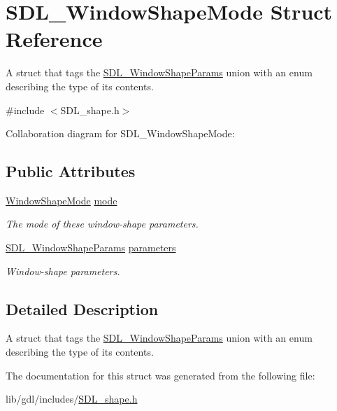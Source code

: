 \hypertarget{struct_s_d_l___window_shape_mode}{}\section{S\+D\+L\+\_\+\+Window\+Shape\+Mode Struct Reference}
\label{struct_s_d_l___window_shape_mode}


A struct that tags the \hyperlink{union_s_d_l___window_shape_params}{S\+D\+L\+\_\+\+Window\+Shape\+Params} union with an enum describing the type of its contents.  




{\ttfamily \#include $<$S\+D\+L\+\_\+shape.\+h$>$}



Collaboration diagram for S\+D\+L\+\_\+\+Window\+Shape\+Mode\+:
\subsection*{Public Attributes}
\begin{DoxyCompactItemize}
\item 
\hypertarget{struct_s_d_l___window_shape_mode_a40ebd8b9a76d982cbd87563386cc05de}{}\hyperlink{_s_d_l__shape_8h_aa30948f2699e316a43b740eccebe5c20}{Window\+Shape\+Mode} \hyperlink{struct_s_d_l___window_shape_mode_a40ebd8b9a76d982cbd87563386cc05de}{mode}\label{struct_s_d_l___window_shape_mode_a40ebd8b9a76d982cbd87563386cc05de}

\begin{DoxyCompactList}\small\item\em The mode of these window-\/shape parameters. \end{DoxyCompactList}\item 
\hypertarget{struct_s_d_l___window_shape_mode_a2f79bb294034156207fa6d88d3a8c819}{}\hyperlink{union_s_d_l___window_shape_params}{S\+D\+L\+\_\+\+Window\+Shape\+Params} \hyperlink{struct_s_d_l___window_shape_mode_a2f79bb294034156207fa6d88d3a8c819}{parameters}\label{struct_s_d_l___window_shape_mode_a2f79bb294034156207fa6d88d3a8c819}

\begin{DoxyCompactList}\small\item\em Window-\/shape parameters. \end{DoxyCompactList}\end{DoxyCompactItemize}


\subsection{Detailed Description}
A struct that tags the \hyperlink{union_s_d_l___window_shape_params}{S\+D\+L\+\_\+\+Window\+Shape\+Params} union with an enum describing the type of its contents. 

The documentation for this struct was generated from the following file\+:\begin{DoxyCompactItemize}
\item 
lib/gdl/includes/\hyperlink{_s_d_l__shape_8h}{S\+D\+L\+\_\+shape.\+h}\end{DoxyCompactItemize}
